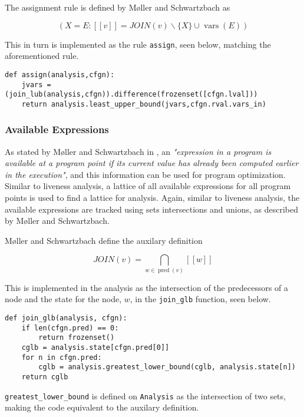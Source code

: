 \noindent The assignment rule is defined by Møller and Schwartzbach as

\begin{equation*}
    (X=E: [[v]] = J O I N(v) \backslash\{X\} \cup \operatorname{vars}(E))
\end{equation*}

\noindent This in turn is implemented as the rule \texttt{assign}, seen below, matching the aforementioned rule. 

\begin{verbatim}
def assign(analysis,cfgn):
    jvars = (join_lub(analysis,cfgn)).difference(frozenset([cfgn.lval]))
    return analysis.least_upper_bound(jvars,cfgn.rval.vars_in)
\end{verbatim}

\subsubsection{Available Expressions}
As stated by Møller and Schwartzbach in \cite{spa}, an \textit{"expression in a program is available at a program point if its current value has already been computed earlier in the execution"}, and this information can be used for program optimization. Similar to liveness analysis, a lattice of all available expressions for all program points is used to find a lattice for analysis. Again, similar to liveness analysis, the available expressions are tracked using sets intersections and unions, as described by Møller and Schwartzbach.

\newpar Møller and Schwartzbach define the auxilary definition

\begin{equation*}
    J O I N (v) = \mathop{\bigcap}_{w \in \operatorname{pred}(v)} [[w]]
\end{equation*}

\noindent This is implemented in the analysis as the intersection of the predecessors of a node and the state for the node, $w$, in the \texttt{join\_glb} function, seen below. 

\begin{verbatim}
def join_glb(analysis, cfgn):
    if len(cfgn.pred) == 0:
        return frozenset()
    cglb = analysis.state[cfgn.pred[0]]
    for n in cfgn.pred:
        cglb = analysis.greatest_lower_bound(cglb, analysis.state[n])
    return cglb
\end{verbatim}

\noindent \texttt{greatest\_lower\_bound} is defined on \texttt{Analysis} as the intersection of two sets, making the code equivalent to the auxilary definition. 

